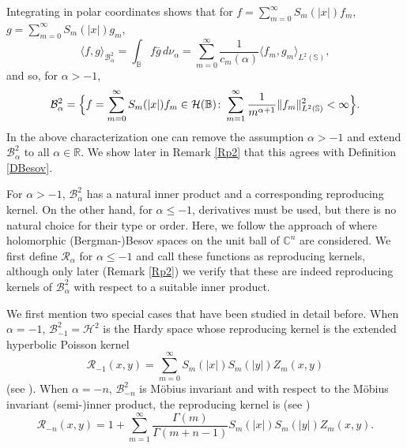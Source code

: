 \documentclass{amsart}
\theoremstyle{definition}
\theoremstyle{remark}
\begin{document}
Integrating in polar coordinates shows that for
$f=\sum_{m=0}^\infty S_m(\vert x\vert)f_m$,
$g=\sum_{m=0}^\infty S_m(\vert x\vert)g_m$,
\begin{equation*}
\langle f,g\rangle_{\mathcal B^2_\alpha}
=\int_{\mathbb B}f\bar{g}\,d\nu_\alpha
=\sum_{m=0}^\infty\frac{1}{c_m(\alpha)}\langle f_m,g_m\rangle_{L^2(\mathbb S)},
\end{equation*}
and so, for $\alpha>-1$,
\begin{equation}\label{B2alpha}
\mathcal B^2_\alpha=\Bigl\{f=\sum_{m=0}^\infty
S_m(\vert x\vert)f_m\in\mathcal H(\mathbb B)\colon
\sum_{m=1}^\infty\frac{1}{m^{\alpha+1}}\|f_m\|^2_{L^2(\mathbb S)}<\infty\Bigr\}.
\end{equation}
In the above characterization one can remove the assumption $\alpha>-1$ and
extend $\mathcal B^2_\alpha$ to all $\alpha\in\mathbb R$.
We show later in Remark \ref{Rp2} that this agrees with Definition \ref{DBesov}.

For $\alpha>-1$, $\mathcal B^2_\alpha$ has a natural inner product and a
corresponding reproducing kernel.
On the other hand, for $\alpha\le -1$, derivatives must be used, but
there is no natural choice for their type or order.
Here, we follow the approach of \cite{K} where holomorphic (Bergman-)Besov
spaces on the unit ball of $\mathbb C^n$ are considered.
We first define $\mathcal R_\alpha$ for $\alpha\le -1$ and
call these functions as reproducing kernels, although only later
(Remark \ref{Rp2}) we verify that these are indeed reproducing kernels
of $\mathcal B^2_\alpha$ with respect to a suitable inner product.

We first mention two special cases that have been studied in detail before.
When $\alpha=-1$, $\mathcal B^2_{-1}=\mathcal H^2$ is the Hardy space whose
reproducing kernel is the extended hyperbolic Poisson kernel
\begin{equation*}
\mathcal R_{-1}(x,y)=\sum_{m=0}^\infty
S_m(\vert x\vert)S_m(\vert y\vert)Z_m(x,y)
\end{equation*}
(see \cite[Theorem 2.5]{St2}).
When $\alpha=-n$, $\mathcal B^2_{-n}$ is M\"{o}bius invariant
and with respect to the M\"{o}bius invariant (semi-)inner product, the
reproducing kernel is (see \cite{BEY})
\begin{equation*}
\mathcal R_{-n}(x,y)=1+\sum_{m=1}^\infty
\frac{\Gamma(m)}{\Gamma(m+n-1)}S_m(\vert x\vert)S_m(\vert y\vert)Z_m(x,y).
\end{equation*}
\end{document}
